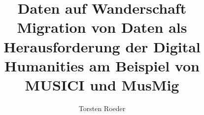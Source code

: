 
\fancyhead[R]{\thepage} %

\title{\LARGE{Daten auf Wanderschaft} \\ \LARGE{Migration von Daten als Herausforderung der Digital Humanities am Beispiel von MUSICI und MusMig}} %
\author{Torsten Roeder} %

\setcounter{page}{1}